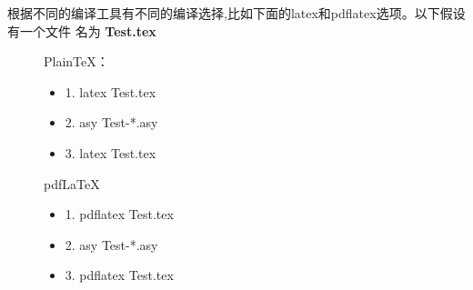 \documentclass[12pt, fontset=windows]{article}
\begin{document}
	根据不同的编译工具有不同的编译选择,比如下面的latex和pdflatex选项。以下假设有一个文件
	名为 \textbf{Test.tex}
	\begin{figure}[!htb]
	    \begin{minipage}[t]{0.4\linewidth}
	        \vspace*{0pt}
	        \begin{tcolorbox}[colback=blue!5!white,colframe=blue!75!black,title=流程一]
	            PlainTeX：
	            \begin{itemize}
	                \item 1. latex Test.tex
	                \item 2. asy Test-*.asy
	                \item 3. latex Test.tex
	            \end{itemize}
	        \end{tcolorbox}
	    \end{minipage}
	    \hfill
	    \begin{minipage}[t]{0.6\linewidth}
	        \vspace*{0pt}
	        \begin{tcolorbox}[colback=blue!5!white,colframe=blue!75!black,title=流程二]
	            pdfLaTeX
	            \begin{itemize}
	                \item 1. pdflatex Test.tex
	                \item 2. asy Test-*.asy
	                \item 3. pdflatex Test.tex
	            \end{itemize}  
	        \end{tcolorbox}
	    \end{minipage}
	\end{figure}
		
\end{document}
